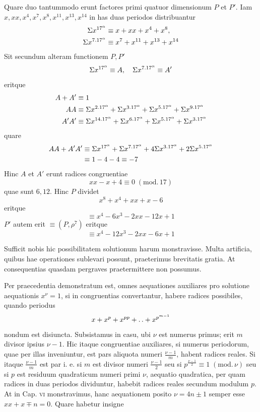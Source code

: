 %
Quare duo tantummodo erunt factores primi quatuor dimensionum $P$ et $P'$. Iam $x,xx,x^4,x^7,x^8,x^{11},x^{13},x^{14}$ in has duas periodos distribuantur
\[
\begin{aligned}
\Sigma x^{17^\alpha}&\equiv x+xx+x^4+x^8,\\
\Sigma x^{7\mathbin{.}17^\alpha}&\equiv x^7+x^{11}+x^{13}+x^{14}
\end{aligned}
\]
Sit secundum alteram functionem $P,P'$
\[
\Sigma x^{17^\alpha}\equiv A,\quad\Sigma x^{7\mathbin{.}17^\alpha}\equiv A'
\]
eritque
\[
\begin{aligned}
A+A'&\equiv1\\
AA&\equiv\Sigma x^{2\mathbin{.}17^\alpha}+\Sigma x^{3\mathbin{.}17^\alpha}+\Sigma x^{5\mathbin{.}17^\alpha}+\Sigma x^{9\mathbin{.}17^\alpha}\\
A'A'&\equiv\Sigma x^{14\mathbin{.}17^\alpha}+\Sigma x^{6\mathbin{.}17^\alpha}+\Sigma x^{5\mathbin{.}17^\alpha}+\Sigma x^{3\mathbin{.}17^\alpha}
\end{aligned}
\]
quare
\[
\begin{aligned}
AA+A'A'&\equiv\Sigma x^{17^\alpha}+\Sigma x^{7\mathbin{.}17^\alpha}+4\Sigma x^{3\mathbin{.}17^\alpha}+2\Sigma x^{5\mathbin{.}17^\alpha}\\
&\equiv1-4-4\equiv-7
\end{aligned}
\]
Hinc $A$ et $A'$ erunt radices congruentiae
\[
xx-x+4\equiv0\;(\mathrm{mod.}\,17)
\]
quae sunt $6,12$. Hinc $P$ dividet
\[
x^8+x^4+xx+x-6
\]
eritque
\[
\equiv x^4-6x^3-2xx-12x+1
\]
$P'$ autem erit $\equiv(P,\rho^7)$ eritque
\[
\equiv x^4-12x^3-2xx-6x+1
\]

Sufficit nobis hic possibilitatem solutionum harum monstravisse. Multa artificia, quibus hae operationes sublevari possunt, praeterimus brevitatis gratia. At consequentias quasdam pergraves praetermittere non possumus.

Per praecedentia demonstratum est, omnes aequationes auxiliares pro solutione aequationis $x^\nu=1$, si in congruentias convertantur, habere radices possibiles, quando periodus
%
\[
x+x^p+x^{pp}+\mathinner{.\,.}+x^{p^{m-1}}
\]
nondum est disiuncta. Subsistamus in casu, ubi $\nu$ est numerus primus; erit $m$ divisor ipsius $\nu-1$. Hic itaque congruentiae auxiliares, si numerus periodorum, quae per illas inveniuntur, est pars aliquota numeri $\frac{\nu-1}m$, habent radices reales. Si itaque $\frac{\nu-1}m$ est par i. e. si $m$ est divisor numeri $\frac{\nu-1}2$ seu si $p^{\frac{\nu-1}2}\equiv1\;(\mathrm{mod.}\,\nu)$ seu si $p$ est residuum quadraticum numeri primi $\nu$, aequatio quadratica, per quam radices in duas periodos dividuntur, habebit radices reales secundum modulum $p$. At in Cap. \textsc{vi} monstravimus, hanc aequationem posito $\nu=4n\pm1$ semper esse $xx+x\mp n=0$. Quare habetur insigne

